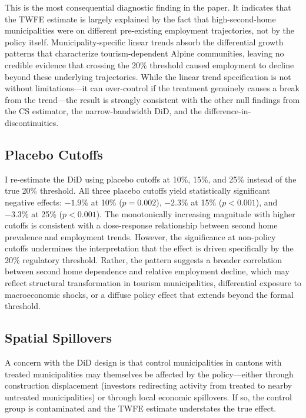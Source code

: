 \documentclass[12pt]{article}
\begin{document}
This is the most consequential diagnostic finding in the paper. It indicates that the TWFE estimate is largely explained by the fact that high-second-home municipalities were on different pre-existing employment trajectories, not by the policy itself. Municipality-specific linear trends absorb the differential growth patterns that characterize tourism-dependent Alpine communities, leaving no credible evidence that crossing the 20\% threshold caused employment to decline beyond these underlying trajectories. While the linear trend specification is not without limitations---it can over-control if the treatment genuinely causes a break from the trend---the result is strongly consistent with the other null findings from the CS estimator, the narrow-bandwidth DiD, and the difference-in-discontinuities.

\subsection{Placebo Cutoffs}

I re-estimate the DiD using placebo cutoffs at 10\%, 15\%, and 25\% instead of the true 20\% threshold. All three placebo cutoffs yield statistically significant negative effects: $-1.9\%$ at 10\% ($p = 0.002$), $-2.3\%$ at 15\% ($p < 0.001$), and $-3.3\%$ at 25\% ($p < 0.001$). The monotonically increasing magnitude with higher cutoffs is consistent with a dose-response relationship between second home prevalence and employment trends. However, the significance at non-policy cutoffs undermines the interpretation that the effect is driven specifically by the 20\% regulatory threshold. Rather, the pattern suggests a broader correlation between second home dependence and relative employment decline, which may reflect structural transformation in tourism municipalities, differential exposure to macroeconomic shocks, or a diffuse policy effect that extends beyond the formal threshold.

\subsection{Spatial Spillovers}

A concern with the DiD design is that control municipalities in cantons with treated municipalities may themselves be affected by the policy---either through construction displacement (investors redirecting activity from treated to nearby untreated municipalities) or through local economic spillovers. If so, the control group is contaminated and the TWFE estimate understates the true effect.
\end{document}
